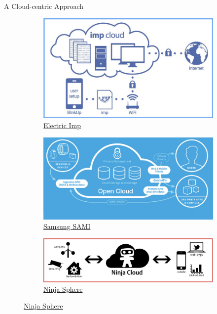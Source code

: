 \begin{frame}{A Cloud-centric Approach}
  \vspace{1em}
  \begin{figure}
    \centering
    \begin{subfigure}[t]{0.48\textwidth}
      \includegraphics[width=\textwidth]{figures/cloud1.png}
      \caption{\href{http://www.limetrace.co.uk/electric-imp-platform}{Electric
          Imp}}
    \end{subfigure}
    \hfill
    \begin{subfigure}[t]{0.48\textwidth}
      \includegraphics[width=\textwidth]{figures/cloud2.png}
      \caption{\href{https://developer.samsungsami.io/sami/sami-documentation/}{Samsung
          SAMI}}
    \end{subfigure}
    \begin{subfigure}[t]{0.7\textwidth}
      \includegraphics[width=\textwidth]{figures/cloud3.png}
      \caption{\href{http://lucept.files.wordpress.com/2012/06/ninja-blocks-capture.jpg}{Ninja Sphere}}
    \end{subfigure}
  \end{figure}
\end{frame}

